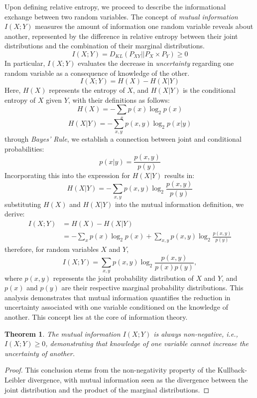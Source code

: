 \documentclass[12pt]{article}
\newtheorem{theorem}{Theorem}
\begin{document}
		
		
		
		
		Upon defining relative entropy, we proceed to describe the informational exchange between two random variables. The concept of \emph{mutual information} \(I(X; Y)\) measures the amount of information one random variable reveals about another, represented by the difference in relative entropy between their joint distributions and the combination of their marginal distributions.
		\[I(X; Y) = D_{KL}(P_{XY} || P_{X} \times P_{Y}) \geq 0\]
		In particular, \(I(X; Y)\) evaluates the decrease in  \emph{uncertainty} regarding one random variable as a consequence of knowledge of the other.
		\[I(X; Y) = H(X) - H(X|Y)\]
		Here, \(H(X)\) represents the entropy of \(X\), and \(H(X|Y)\) is the conditional entropy of \(X\) given \(Y\), with their definitions as follows:
		\[H(X) = -\sum_{x} p(x) \log_2 p(x)\]
		\[H(X|Y) = -\sum_{x,y} p(x,y) \log_2 p(x|y)\]
		through \emph{Bayes' Rule}, we establish a connection between joint and conditional probabilities:
		\[p(x|y) = \frac{p(x,y)}{p(y)}\]
		Incorporating this into the expression for \(H(X|Y)\) results in:
		\[H(X|Y) = -\sum_{x,y} p(x,y) \log_2 \frac{p(x,y)}{p(y)}\]
		substituting \(H(X)\) and \(H(X|Y)\) into the mutual information definition, we derive:
		\[
		\begin{aligned}
			I(X; Y) &= H(X) - H(X|Y) \\
			&= -\sum_{x} p(x) \log_2 p(x) + \sum_{x,y} p(x,y) \log_2 \frac{p(x,y)}{p(y)} 
		\end{aligned}
		\]
		therefore, for random variables \(X\) and \(Y\),
		\begin{equation}
			I(X; Y) = \sum_{x,y} p(x,y) \log_2 \frac{p(x,y)}{p(x)p(y)},
		\end{equation}
		where \(p(x,y)\) represents the joint probability distribution of \(X\) and \(Y\), and \(p(x)\) and \(p(y)\) are their respective marginal probability distributions. This analysis demonstrates that mutual information quantifies the reduction in uncertainty associated with one variable conditioned on the knowledge of another. This concept lies at the core of information theory.
		\begin{theorem}
			The mutual information \(I(X; Y)\) is always non-negative, i.e., \(I(X; Y) \geq 0\), demonstrating that knowledge of one variable cannot increase the uncertainty of another.
		\end{theorem}
		\begin{proof}
		This conclusion stems from the non-negativity property of the Kullback-Leibler divergence, with mutual information seen as the divergence between the joint distribution and the product of the marginal distributions.
		\end{proof}
		
\end{document}
